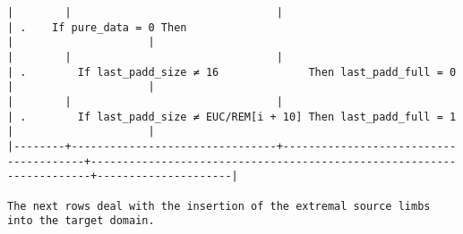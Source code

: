 \documentclass[varwidth=\maxdimen,margin=0.5cm,multi={verbatim}]{standalone}
\begin{document}
\begin{verbatim}
|        |                                |                                       | .    If pure_data = 0 Then                                           |                     |
|        |                                |                                       | .        If last_padd_size ≠ 16              Then last_padd_full = 0 |                     |
|        |                                |                                       | .        If last_padd_size ≠ EUC/REM[i + 10] Then last_padd_full = 1 |                     |
|--------+--------------------------------+---------------------------------------+----------------------------------------------------------------------+---------------------|

The next rows deal with the insertion of the extremal source limbs into the target domain.


\end{verbatim}
\end{document}
